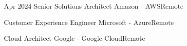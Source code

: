 \documentclass[../resume.tex]{subfiles}
\begin{document}
\experience
{Apr 2024}
{Senior Solutions Architect}
{Amazon - AWS}{Remote}
{
\item \lipsum[1][1-3] 
\item \lipsum[1][4-7] 
\item \lipsum[2][1-4] 
\item \lipsum[3][1-2] 
}

{Customer Experience Engineer}
{Microsoft - Azure}{Remote}
{
\item \lipsum[4][1-2] 
\item \lipsum[5][1-3] 
\item \lipsum[6][1-4] 
}

{Cloud Architect}
{Google - Google Cloud}{Remote}
{
\item \lipsum[7][1-4] 
\item \lipsum[8][1-4] 
\item \lipsum[9][1-2] 
\item \lipsum[10][1-5] 
\item \lipsum[10][6-9] 
}
\end{document}
